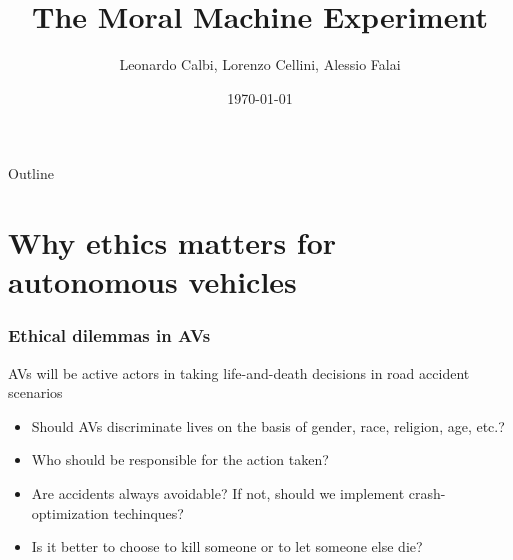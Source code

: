 \documentclass[aspectratio=169]{beamer}
\title[MME]{The Moral Machine Experiment}
\author{Leonardo Calbi, Lorenzo Cellini, Alessio Falai\\}
\institute{Alma Mater Studiorum - University of Bologna}
\date{\today}
\begin{document}
\maketitle

\begin{frame}{Outline}
    \tableofcontents
\end{frame}

\section{Why ethics matters for autonomous vehicles}

\begin{frame}
    \frametitle{Ethical dilemmas in AVs}
    AVs will be active actors in taking life-and-death decisions in road accident scenarios \cite{why-ethics-matters}
    \begin{itemize}
        \item Should AVs discriminate lives on the basis of gender, race, religion, age, etc.?
        \item Who should be responsible for the action taken?
        \item Are accidents always avoidable? If not, should we implement crash-optimization techinques?
        \item Is it better to choose to kill someone or to let someone else die?
    \end{itemize}
\end{frame}
\end{document}
